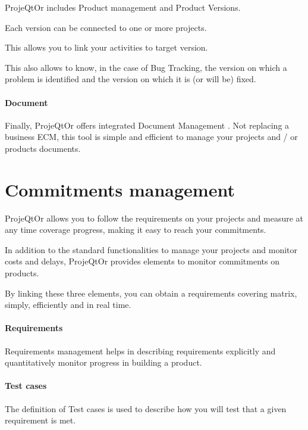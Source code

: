 \documentclass[letterpaper,10pt,english]{sphinxmanual}
\begin{document}
ProjeQtOr includes Product management and Product Versions.

Each version can be connected to one or more projects.

This allows you to link your activities to target version.

This also allows to know, in the case of Bug Tracking, the version on which a problem is identified and the version on which it is (or will be) fixed.

\paragraph{Document}

Finally, ProjeQtOr offers integrated Document Management . Not replacing a business ECM, this tool is simple and efficient to manage your projects and / or products documents.
\newpage
{}

\section{Commitments management}
\label{Features:commitments-management}\label{Features:index-43}
ProjeQtOr  allows you to follow the requirements on your projects and measure at any time coverage progress, making it easy to reach your commitments.

In addition to the standard functionalities to manage your projects and monitor costs and delays, ProjeQtOr  provides elements to monitor commitments on products.

By linking these three elements, you can obtain a requirements covering matrix, simply, efficiently and in real time.

\paragraph{Requirements}

Requirements management  helps in describing requirements explicitly and quantitatively monitor progress in building a product.

\paragraph{Test cases}

The definition of Test cases is used to describe how you will test that a given requirement is met.
\end{document}

